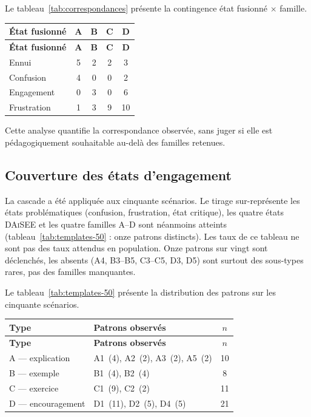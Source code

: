 Le tableau~\ref{tab:correspondances} présente la contingence état fusionné $\times$ famille.

{\small
\renewcommand{\arraystretch}{1.18}
\setlength{\tabcolsep}{4pt}
\begin{xltabular}{\textwidth}{|>{\raggedright\arraybackslash}X|c|c|c|c|}
\hline
{}
\textbf{État fusionné} & \textbf{A} & \textbf{B} & \textbf{C} & \textbf{D} \\
\hline
\endfirsthead
\hline
{}
\textbf{État fusionné} & \textbf{A} & \textbf{B} & \textbf{C} & \textbf{D} \\
\hline
\endhead
\endfoot
\endlastfoot
Ennui & 5 & 2 & 2 & 3 \\
\hline
Confusion & 4 & 0 & 0 & 2 \\
\hline
Engagement & 0 & 3 & 0 & 6 \\
\hline
Frustration & 1 & 3 & 9 & 10 \\
\hline
\end{xltabular}
\label{tab:correspondances}
}

Cette analyse quantifie la correspondance observée, sans juger si elle
est pédagogiquement souhaitable au-delà des familles retenues.

\subsection{Couverture des états d'engagement}

La cascade a été appliquée aux cinquante scénarios. Le tirage
sur-représente les états problématiques (confusion, frustration, état
critique), les quatre états \textsc{DAiSEE} et les quatre familles A--D
sont néanmoins atteints (tableau~\ref{tab:templates-50} : onze patrons
distincts). Les taux de ce tableau ne sont pas des taux attendus
en population. Onze patrons sur vingt sont déclenchés, les absents
(A4, B3--B5, C3--C5, D3, D5) sont surtout des sous-types rares, pas des
familles manquantes.

Le tableau~\ref{tab:templates-50} présente la distribution des patrons sur les cinquante scénarios.

{\small
\renewcommand{\arraystretch}{1.18}
\setlength{\tabcolsep}{4pt}
\begin{xltabular}{\textwidth}{|>{\raggedright\arraybackslash}X|l|c|}
\hline
{}
\textbf{Type} & \textbf{Patrons observés} & \textbf{$n$} \\
\hline
\endfirsthead
\hline
{}
\textbf{Type} & \textbf{Patrons observés} & \textbf{$n$} \\
\hline
\endhead
\endfoot
\endlastfoot
A --- explication & A1~(4), A2~(2), A3~(2), A5~(2) & 10 \\
\hline
B --- exemple & B1~(4), B2~(4) & 8 \\
\hline
C --- exercice & C1~(9), C2~(2) & 11 \\
\hline
D --- encouragement & D1~(11), D2~(5), D4~(5) & 21 \\
\hline
\end{xltabular}
\label{tab:templates-50}
}

